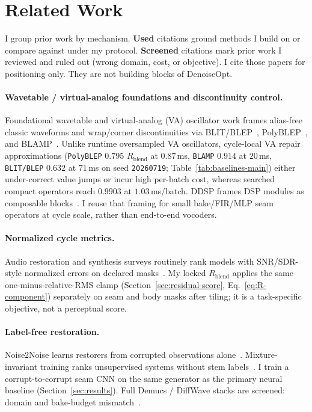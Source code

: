 \section{Related Work}
\label{sec:related_work}

I group prior work by mechanism.
\textbf{Used} citations ground methods I build on or compare against under my protocol.
\textbf{Screened} citations mark prior work I reviewed and ruled out (wrong domain, cost, or objective).
I cite those papers for positioning only.
They are not building blocks of DenoiseOpt.

\paragraph{Wavetable / virtual-analog foundations and discontinuity control.}
Foundational wavetable and virtual-analog (VA) oscillator work frames alias-free classic waveforms and wrap/corner discontinuities via BLIT/BLEP~\cite{stilson1996}, PolyBLEP~\cite{nam2009polyblep}, and BLAMP~\cite{esqueda2016blamp}.
Unlike runtime oversampled VA oscillators, cycle-local VA repair approximations (\texttt{PolyBLEP} $0.795$ $R_{\mathrm{blend}}$ at $0.87$\,ms, \texttt{BLAMP} $0.914$ at $20$\,ms, \texttt{BLIT/BLEP} $0.632$ at $71$\,ms on seed \texttt{20260719}; Table~\ref{tab:baselines-main}) either under-correct value jumps or incur high per-batch cost, whereas searched compact operators reach $0.9903$ at $1.03$\,ms/batch.
DDSP frames DSP modules as composable blocks~\cite{engel2020}.
I reuse that framing for small bake/FIR/MLP seam operators at cycle scale, rather than end-to-end vocoders.

\paragraph{Normalized cycle metrics.}
Audio restoration and synthesis surveys routinely rank models with SNR/SDR-style normalized errors on declared masks~\cite{purwins2019,stoller2018}.
My locked $R_{\mathrm{blend}}$ applies the same one-minus-relative-RMS clamp (Section~\ref{sec:residual-score}, Eq.~\eqref{eq:R-component}) separately on seam and body masks after tiling; it is a task-specific objective, not a perceptual score.

\paragraph{Label-free restoration.}
Noise2Noise learns restorers from corrupted observations alone~\cite{lehtinen2018,kashyap2021n2n}.
Mixture-invariant training ranks unsupervised systems without stem labels~\cite{wisdom2020}.
I train a corrupt-to-corrupt seam CNN on the same generator as the primary neural baseline (Section~\ref{sec:results}).
Full Demucs / DiffWave stacks are screened: domain and bake-budget mismatch~\cite{dfossez2019,kong2021}.

